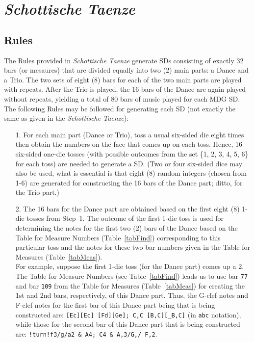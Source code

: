 \documentclass[a4paper,x11names,svgnames,10pt]{article}
\begin{document}
{\section{\em Schottische Taenze}

\subsection{Rules}\label{mdgRules}

The Rules provided in {\em Schottische Taenze} generate SDs consisting of exactly 32 bars (or mesaures) that are divided equally into two (2) main parts: a Dance and a Trio.  The two sets of eight (8) bars for each of the two main parts are played with repeats.  After the Trio is played, the 16 bars of the Dance are again played without repeats, yielding a total of 80 bars of music played for each MDG SD. \\

The following Rules may be followed for generating each SD (not exactly the same as given in the {\it Schottische Taenze}):

\begin{enumerate}
	\item [1.] For each main part (Dance or Trio), toss a usual six-sided die eight times then obtain the numbers on the face that comes up on each toss.  Hence, 16 six-sided one-die tosses (with possible outcomes from the set \{1, 2, 3, 4, 5, 6\} for each toss) are needed to generate a SD. (Two or four six-sided dice may also be used, what is essential is that eight (8) random integers (chosen from 1-6) are generated for constructing the 16 bars of the Dance part; ditto, for the Trio part.)
	\item [2.\label{step2}] The 16 bars for the Dance part are obtained based on the first eight (8) 1-die tosses from Step~1.  The outcome of the first 1-die toss is used for determining the notes for the first two (2) bars of the Dance based on the Table for Measure Numbers (Table~\ref{tabFind}) corresponding to this particular toss and the notes for these two bar numbers given in the Table for Measures (Table~\ref{tabMeas}).\\
	For example, suppose the first 1-die toss (for the Dance part) comes up a 2. The  Table for Measure Numbers (see Table~\ref{tabFind}) leads us to use bar {\tt 77} and bar {\tt 109} from the Table for Measures (Table~\ref{tabMeas}) for creating the 1st and 2nd bars, respectively, of this Dance part.  Thus, the G-clef notes and F-clef notes for the first bar of this Dance part being that is being constructed are: {\tt [Ec][Ec] [Fd][Ge]; C,C [B,C][\_B,C]} (in {\tt abc} notation), while those for the second bar of this Dance part that is being constructed are: {\tt !turn!f3/g/a2 \& A4; C4 \& A,3/G,/ F,2}. 


\end{enumerate}}
\end{document}
